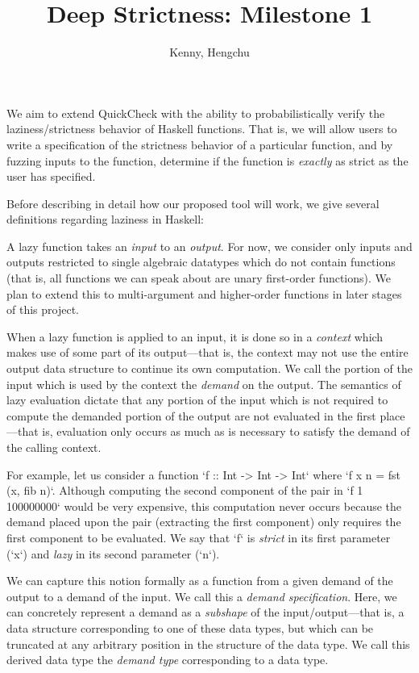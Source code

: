 \documentclass{article}
\title{Deep Strictness: Milestone 1}
\author{Kenny, Hengchu}
\begin{document}
\maketitle

We aim to extend QuickCheck with the ability to probabilistically
verify the laziness/strictness behavior of Haskell functions. That is,
we will allow users to write a specification of the strictness
behavior of a particular function, and by fuzzing inputs to the
function, determine if the function is \emph{exactly} as strict as the
user has specified.

Before describing in detail how our proposed tool will work, we give
several definitions regarding laziness in Haskell:

A lazy function takes an \emph{input} to an \emph{output}. For now, we
consider only inputs and outputs restricted to single algebraic
datatypes which do not contain functions (that is, all functions we
can speak about are unary first-order functions). We plan to extend
this to multi-argument and higher-order functions in later stages of
this project.

When a lazy function is applied to an input, it is done so in a
\emph{context} which makes use of some part of its output---that is,
the context may not use the entire output data structure to continue
its own computation. We call the portion of the input which is used by
the context the \emph{demand} on the output. The semantics of lazy
evaluation dictate that any portion of the input which is not required
to compute the demanded portion of the output are not evaluated in the
first place---that is, evaluation only occurs as much as is necessary
to satisfy the demand of the calling context.

For example, let us consider a function `f :: Int -> Int -> Int` where
`f x n = fst (x, fib n)`. Although computing the second component of
the pair in `f 1 100000000` would be very expensive, this computation
never occurs because the demand placed upon the pair (extracting the
first component) only requires the first component to be evaluated. We
say that `f` is \emph{strict} in its first parameter (`x`) and
\emph{lazy} in its second parameter (`n`).

We can capture this notion formally as a function from a given demand
of the output to a demand of the input. We call this a \emph{demand
  specification}. Here, we can concretely represent a demand as a
\emph{subshape} of the input/output---that is, a data structure
corresponding to one of these data types, but which can be truncated
at any arbitrary position in the structure of the data type. We call
this derived data type the \emph{demand type} corresponding to a data
type.
\end{document}
